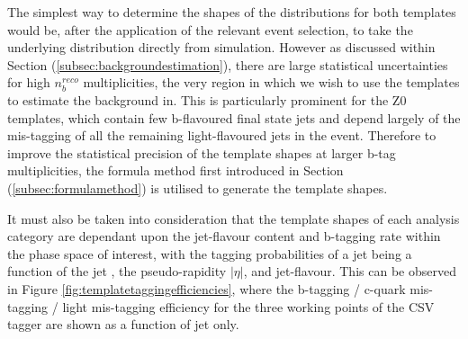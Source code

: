 The simplest way to determine the shapes of the \nbreco distributions for both templates would be, after the application of the relevant event selection, to take the underlying \nbreco distribution directly from simulation. However as discussed within Section (\ref{subsec:backgroundestimation}), there are large statistical uncertainties for high $n_{b}^{reco}$ multiplicities, the very region in which we wish to use the templates to estimate the background in. This is particularly prominent for the Z0 templates, which contain few b-flavoured final state jets and depend largely of the mis-tagging of all the remaining light-flavoured jets in the event. Therefore to improve the statistical precision of the template shapes at larger b-tag multiplicities, the formula method first introduced in Section (\ref{subsec:formulamethod}) is utilised to generate the template shapes. 

It must also be taken into consideration that the template shapes of each analysis category are dependant upon the jet-flavour content and b-tagging rate within the phase space of interest, with the tagging probabilities of a jet being a function of the jet \pt, the pseudo-rapidity $\rvert\eta\lvert$, and jet-flavour. This can be observed in Figure \ref{fig:templatetaggingefficiencies}, where the b-tagging / c-quark mis-tagging / light mis-tagging efficiency for the three working points of the \ac{CSV} tagger are shown as a function of jet \pt only. 


